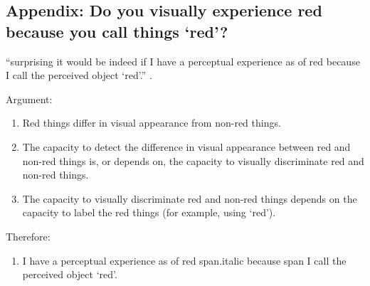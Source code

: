 \documentclass[12pt]{extarticle}
\begin{document}
\begin{multicols*}{3}
\section{Appendix: Do you visually experience red because you call things ‘red’?}

“surprising it would be indeed if I have a perceptual experience as of red because I call the perceived object ‘red’.”
\citep[pp.~324--5]{Stokes:2006fd}.

Argument:
\begin{enumerate}
\item Red things differ in visual appearance from non-red things.
\item The capacity to detect the difference in visual appearance between
red and non-red things is, or depends on, the capacity to visually
discriminate red and non-red things.
\item The capacity to visually discriminate red and non-red things depends
on the capacity to label the red things (for example, using ‘red’).
\end{enumerate}
Therefore:
\begin{enumerate}[resume]
\item I have a perceptual experience as of red span.italic
because span I call the perceived object ‘red’.
\end{enumerate}




\footnotesize


\end{multicols*}
\end{document}
